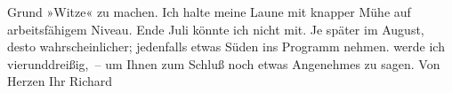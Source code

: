 \begin{ledgroupsized}[t]{13cm}
               Grund »Witze« zu machen. Ich halte meine Laune mit knapper Mühe auf arbeits{\pb}fähigem Niveau. Ende
                  Juli könnte ich nicht mit. Je später im August, desto wahrscheinlicher;
               jedenfalls etwas Süden ins Programm nehmen. \label{K_L01046_1v}\label{K_L01046_1h} werde ich vierunddreißig, –
               um Ihnen zum Schluß noch etwas Angenehmes zu sagen.\pend
           \pstart Von Herzen Ihr \spacefill\mbox{Richard}\pend{}          \endnumbering{}\end{ledgroupsized}  \newcommand{\dateiname}{L01046}\newcommand{\titel}{Richard Beer-Hofmann an Arthur Schnitzler, 20. 6. 1900}\newcommand{\editorInnen}{Martin Anton Müller und Gerd-Hermann Susen}
            \footnotesize
\begin{ledgroupsized}[t]{11.5cm}
\end{ledgroupsized}
         
      